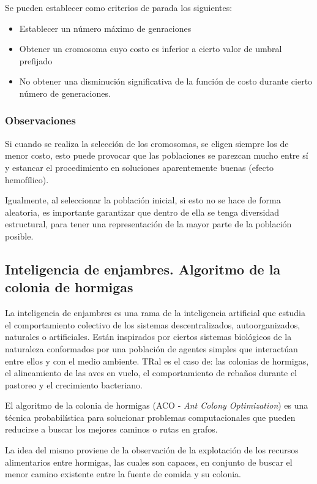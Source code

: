 \documentclass[titlepage, 11pt]{scrartcl}
\begin{document}
	    		Se pueden establecer como criterios de parada los siguientes:
	    		\begin{itemize}
	    			\item Establecer un número máximo de genraciones
	    			\item Obtener un cromosoma cuyo costo es inferior a cierto valor de umbral prefijado
	    			\item No obtener una disminución significativa de la función de costo durante cierto número de generaciones.
	    		\end{itemize}
    		
    		\subsubsection{Observaciones}
    			Si cuando se realiza la selección de los cromosomas, se eligen siempre los de menor costo, esto puede provocar que las poblaciones se parezcan mucho entre sí y estancar el procedimiento en soluciones aparentemente buenas (efecto hemofílico).
    			
    			Igualmente, al seleccionar la población inicial, si esto no se hace de forma aleatoria, es importante garantizar que dentro de ella se tenga diversidad estructural, para tener una representación de la mayor parte de la población posible.
	    
	    
	    
	    \subsection{Inteligencia de enjambres. Algoritmo de la colonia de hormigas}
	    	La inteligencia de enjambres es una rama de la inteligencia artificial que estudia el comportamiento colectivo de los sistemas descentralizados, autoorganizados, naturales o artificiales. Están inspirados por ciertos sistemas biológicos de la naturaleza conformados por una población de agentes simples que interactúan entre ellos y con el medio ambiente. TRal es el caso de: las colonias de hormigas, el alineamiento de las aves en vuelo, el comportamiento de rebaños durante el pastoreo y el crecimiento bacteriano.
	    	
	    	El algoritmo de la colonia de hormigas (ACO - \textit{Ant Colony Optimization}) es una técnica probabilística para solucionar problemas computacionales que pueden reducirse a buscar los mejores caminos o rutas en grafos.
	    	
			La idea del mismo proviene de la observación de la explotación de los recursos alimentarios entre hormigas, las cuales son capaces, en conjunto de buscar el menor camino existente entre la fuente de comida y su colonia.
			
\end{document}
